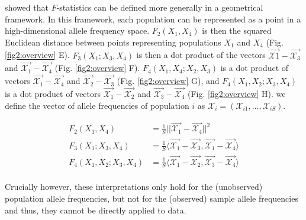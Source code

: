 \documentclass[12pt]{article}
\newcommand{\CX}{\mathcal{X}}
\begin{document}
\cite{oteo-garcia_geometrical_2021} showed that $F$-statistics can be defined more generally in a geometrical framework. In this framework, each population can be represented as a point in a high-dimensional allele frequency space. $F_2(X_1, X_4)$ is then the  squared Euclidean distance between points representing populations $X_1$ and $X_4$ (Fig. \ref{fig2:overview} E). $F_3(X_1;X_3,X_4)$ is then a dot product of the vectors $\Vec{\CX1} - \Vec{\CX_3}$ and $\Vec{\CX_1} - \Vec{\CX_4}$ (Fig. \ref{fig2:overview} F). $F_4(X_1,X_4;X_2,X_3)$ is a dot product of vectors $\Vec{\CX_1} - \Vec{\CX_4}$ and $\Vec{\CX_2} - \Vec{\CX_3}$ (Fig. \ref{fig2:overview} G), and $F_4(X_1,X_2;X_3,X_4)$ is a dot product of vectors $\Vec{\CX_1} - \Vec{\CX_2}$ and $\Vec{\CX_3} - \Vec{\CX_4}$ (Fig. \ref{fig2:overview} H).  we define the vector of allele frequencies of population $i$ as $\mathcal{X}_i = (\mathcal{X}_{i1}, \dots, \mathcal{X}_{iS})$. 

\begin{align}\label{eq:f_geometric}
F_2(X_1,X_4) &= \frac{1}{S}||\Vec{\mathcal{X}_{1}} - \vec{\mathcal{X}_{4}}||^2\nonumber\\
F_3(X_1;X_3,X_4) &= \frac{1}{S} \langle\vec{\mathcal{X}_{1}} - \vec{\mathcal{X}_{3}},\vec{\mathcal{X}_{1}} - \vec{\mathcal{X}_{4}}\rangle\nonumber\\
F_4(X_1,X_2;X_3,X_4) &= \frac{1}{S}\langle\vec{\mathcal{X}_{1}} - \vec{\mathcal{X}_{2}},\vec{\mathcal{X}_{3}} - \vec{\mathcal{X}_{4}}\rangle\nonumber\\
\end{align}

Crucially however, these interpretations only hold for the (unobserved) population allele frequencies, but not for the (observed) sample allele frequencies and thus, they cannot be directly applied to data.
\end{document}
